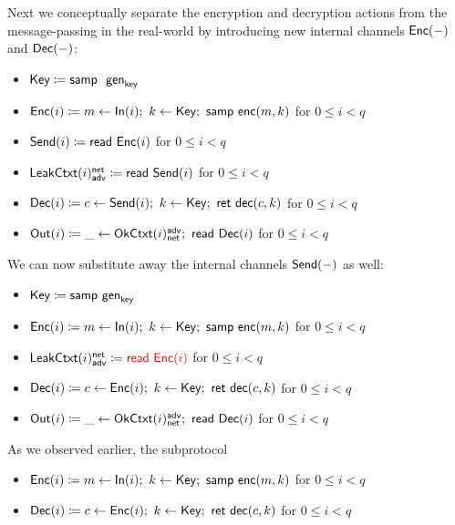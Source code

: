 \noindent Next we conceptually separate the encryption and decryption actions from the message-passing in the real-world by introducing new internal channels $\mathsf{Enc}(-)$ and $\mathsf{Dec}(-)$:

\begin{itemize}
\item $\Key \coloneqq \samp \ \gen_\key$
\item {\color{red} $\mathsf{Enc}(i) \coloneqq m \leftarrow \mathsf{In}(i); \ k \leftarrow \mathsf{Key}; \ \mathsf{samp} \ \mathsf{enc}(m,k)$ for $0 \leq i < q$}
\item {\color{red} $\mathsf{Send}(i) \coloneqq \mathsf{read} \ \mathsf{Enc}(i)$ for $0 \leq i < q$}
\item $\mathsf{LeakCtxt}(i)^{\mathsf{net}}_{\mathsf{adv}} \coloneqq \mathsf{read} \ \mathsf{Send}(i)$ for $0 \leq i < q$
\item {\color{red} $\mathsf{Dec}(i) \coloneqq c \leftarrow \mathsf{Send}(i); \ k \leftarrow \mathsf{Key}; \ \mathsf{ret} \ \mathsf{dec}(c,k)$ for $0 \leq i < q$}
\item {\color{red} $\mathsf{Out}(i) \coloneqq \_ \leftarrow \mathsf{OkCtxt}(i)^{\mathsf{adv}}_{\mathsf{net}}; \ \mathsf{read} \ \mathsf{Dec}(i)$} for $0 \leq i < q$
\end{itemize}

\noindent We can now substitute away the internal channels $\mathsf{Send}(-)$ as well:

\begin{itemize}
\item $\mathsf{Key} \coloneqq \mathsf{samp} \ \mathsf{gen}_{\mathsf{key}}$
\item $\mathsf{Enc}(i) \coloneqq m \leftarrow \mathsf{In}(i); \ k \leftarrow \mathsf{Key}; \ \mathsf{samp} \ \mathsf{enc}(m,k)$ for $0 \leq i < q$
\item {\color{red} $\mathsf{LeakCtxt}(i)^{\mathsf{net}}_{\mathsf{adv}} \coloneqq {\color{red} \mathsf{read} \ \mathsf{Enc}(i)}$ for $0 \leq i < q$}
\item {\color{red} $\mathsf{Dec}(i) \coloneqq c \leftarrow \mathsf{Enc}(i); \ k \leftarrow \mathsf{Key}; \ \mathsf{ret} \ \mathsf{dec}(c,k)$ for $0 \leq i < q$}
\item $\mathsf{Out}(i) \coloneqq \_ \leftarrow \mathsf{OkCtxt}(i)^{\mathsf{adv}}_{\mathsf{net}}; \ \mathsf{read} \ \mathsf{Dec}(i)$ for $0 \leq i < q$
\end{itemize}

\noindent As we observed earlier, the subprotocol

\begin{itemize}
\item $\mathsf{Enc}(i) \coloneqq m \leftarrow \mathsf{In}(i); \ k \leftarrow \mathsf{Key}; \ \mathsf{samp} \ \mathsf{enc}(m,k)$ for $0 \leq i < q$
\item $\mathsf{Dec}(i) \coloneqq c \leftarrow \mathsf{Enc}(i); \ k \leftarrow \mathsf{Key}; \ \mathsf{ret} \ \mathsf{dec}(c,k)$ for $0 \leq i < q$
\end{itemize}

